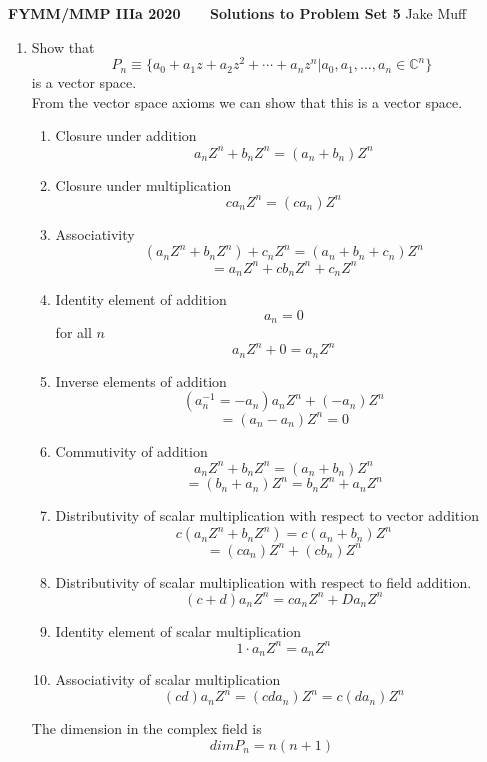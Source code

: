 \documentclass[12pt]{article}
\begin{document}
\normalsize

\baselineskip 14pt

\begin{center}
{\Large {\bf FYMM/MMP IIIa 2020 \ \ \  Solutions to Problem Set 5}}
Jake Muff
\end{center}

\bigskip

\noindent

\begin{enumerate}

\item Show that
$$
  P_n \equiv \{ a_0 +a_1 z + a_2 z^2 +\cdots + a_n  z^n | a_0,a_1,\ldots ,a_n \in \mathbb{C}^n \}
$$
is a vector space.
\\
From the vector space axioms we can show that this is a vector space. 
\begin{enumerate}
  \item Closure under addition 
  $$ a_n Z^n + b_n Z^n = (a_n + b_n) Z^n $$
  \item Closure under multiplication
  $$ c a_n Z^n = (c a_n ) Z^n $$
  \item Associativity
  $$ (a_n Z^n + b_n Z^n) + c_n Z^n = (a_n + b_n +c_n)Z^n $$
  $$ = a_n Z^n + c b_n Z^n + c_n Z^n $$
  \item Identity element of addition 
  $$ a_n = 0 $$
  for all $n$ 
  $$ a_n Z^n + 0 = a_n Z^n $$
  \item Inverse elements of addition 
  $$ (a_n^{-1} = - a_n) a_n Z^n + (-a_n) Z^n $$
  $$ = (a_n -a_n)Z^n = 0 $$
  \item Commutivity of addition 
  $$ a_n Z^n + b_n Z^n = (a_n + b_n ) Z^n $$
  $$ = (b_n + a_n) Z^n = b_n Z^n + a_n Z^n $$
  \item Distributivity of scalar multiplication with respect to vector addition
  $$ c (a_n Z^n + b_n Z^n) = c (a_n + b_n) Z^n $$
  $$ = (c a_n)Z^n + (c b_n) Z^n $$
  \item Distributivity of scalar multiplication with respect to field addition. 
  $$ (c + d) a_n Z^n = c a_n Z^n + D a_n Z^n $$
  \item Identity element of scalar multiplication 
  $$ 1 \cdot a_n Z^n = a_n Z^n $$ 
  \item Associativity of scalar multiplication 
  $$ (cd)a_n Z^n = (c d a_n )Z^n = c (d a_n ) Z^n $$

\end{enumerate}
The dimension in the complex field is 
$$ dim P_n = n(n+1) $$ 


\end{enumerate}
\end{document}
